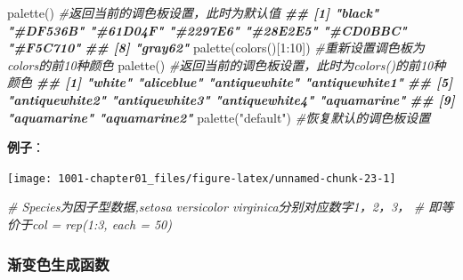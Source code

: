 \documentclass[
]{book}
\newenvironment{Shaded}{\begin{snugshade}}{\end{snugshade}}
\newcommand{\AttributeTok}[1]{\textcolor[rgb]{0.77,0.63,0.00}{#1}}
\newcommand{\CommentTok}[1]{\textcolor[rgb]{0.56,0.35,0.01}{\textit{#1}}}
\newcommand{\DecValTok}[1]{\textcolor[rgb]{0.00,0.00,0.81}{#1}}
\newcommand{\DocumentationTok}[1]{\textcolor[rgb]{0.56,0.35,0.01}{\textbf{\textit{#1}}}}
\newcommand{\FunctionTok}[1]{\textcolor[rgb]{0.00,0.00,0.00}{#1}}
\newcommand{\NormalTok}[1]{#1}
\newcommand{\SpecialCharTok}[1]{\textcolor[rgb]{0.00,0.00,0.00}{#1}}
\newcommand{\StringTok}[1]{\textcolor[rgb]{0.31,0.60,0.02}{#1}}
\begin{document}
\begin{Shaded}
\begin{Highlighting}[]
\FunctionTok{palette}\NormalTok{()  }\CommentTok{\#返回当前的调色板设置，此时为默认值}
\DocumentationTok{\#\# [1] "black"   "\#DF536B" "\#61D04F" "\#2297E6" "\#28E2E5" "\#CD0BBC" "\#F5C710"}
\DocumentationTok{\#\# [8] "gray62"}
\FunctionTok{palette}\NormalTok{(}\FunctionTok{colors}\NormalTok{()[}\DecValTok{1}\SpecialCharTok{:}\DecValTok{10}\NormalTok{])  }\CommentTok{\#重新设置调色板为colors的前10种颜色}
\FunctionTok{palette}\NormalTok{()  }\CommentTok{\#返回当前的调色板设置，此时为colors()的前10种颜色}
\DocumentationTok{\#\#  [1] "white"         "aliceblue"     "antiquewhite"  "antiquewhite1"}
\DocumentationTok{\#\#  [5] "antiquewhite2" "antiquewhite3" "antiquewhite4" "aquamarine"   }
\DocumentationTok{\#\#  [9] "aquamarine"    "aquamarine2"}
\FunctionTok{palette}\NormalTok{(}\StringTok{"default"}\NormalTok{)  }\CommentTok{\#恢复默认的调色板设置}
\end{Highlighting}
\end{Shaded}

\textbf{例子}：

\begin{Shaded}
\end{Shaded}

\begin{center}\texttt{[image: 1001-chapter01\_files/figure-latex/unnamed-chunk-23-1]} \end{center}

\begin{Shaded}
\begin{Highlighting}[]
\CommentTok{\# Species为因子型数据,setosa versicolor virginica分别对应数字1，2，3，}
\CommentTok{\# 即等价于col = rep(1:3, each = 50)}
\end{Highlighting}
\end{Shaded}

\hypertarget{ux6e10ux53d8ux8272ux751fux6210ux51fdux6570}{%
\subsubsection{渐变色生成函数}\label{ux6e10ux53d8ux8272ux751fux6210ux51fdux6570}}
\end{document}
